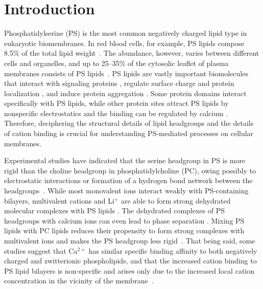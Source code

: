 \documentclass[journal=jpcbfk,manuscript=article]{achemso}
\begin{document}

\maketitle %

\section{Introduction}
Phosphatidylserine (PS) is the most common negatively
charged lipid type in eukaryotic biomembranes. In red blood cells, for example,
PS lipids compose 8.5\% of the total lipid weight~\cite{lemmon08}. 
The abundance, however, varies between different cells and organelles, and up to
25--35\% of the cytosolic leaflet of plasma membranes consists of PS lipids~\cite{leventis10,li14}.
PS lipids are vastly important biomolecules that interact with
signaling proteins \cite{leventis10}, regulate
surface charge and protein localization \cite{yeung08}, and
induce protein aggregation \cite{zhao04,gorbenko06}.
Some protein domains interact specifically with PS lipids,
while other protein sites attract PS lipids by nonspecific electrostatics and the
binding can be regulated by calcium \cite{leventis10}.
Therefore, deciphering the structural details
of lipid headgroups and the details of cation binding
is crucial for understanding PS-mediated processes on cellular membranes.

Experimental studies have indicated that the
serine headgroup in PS is more rigid than the choline headgroup in phosphatidylcholine (PC),
owing possibly to electrostatic interactions or formation of a hydrogen bond network between the headgroups~\cite{browning80,buldt81}.
While most monovalent ions interact weakly with
PS-containing bilayers, multivalent cations and Li$^+$ are able to form strong
dehydrated molecular complexes with PS lipids \cite{hauser77,kurland79,eisenberg79,hauser83,dluhy83,hauser85,feigenson86,mattai89,roux90,roux91,boettcher11}.
The dehydrated complexes of PS headgroups with calcium ions can even lead to
phase separation \cite{hauser77,kurland79,hauser85,feigenson86,mattai89,roux90,roux91}. Mixing PS lipids with PC lipids reduces their propensity to form strong complexes with multivalent ions and makes the PS headgroup less rigid~\cite{browning80,buldt81,roux90,roux91}.
That being said, some studies suggest that Ca$^{2+}$ has similar specific binding affinity 
to both negatively charged and zwitterionic phospholipids, and that
the increased cation binding to PS lipid bilayers is non-specific and arises only due to the increased local cation concentration in the vicinity of the membrane~\cite{seelig90,sinn06}. 
\end{document}
